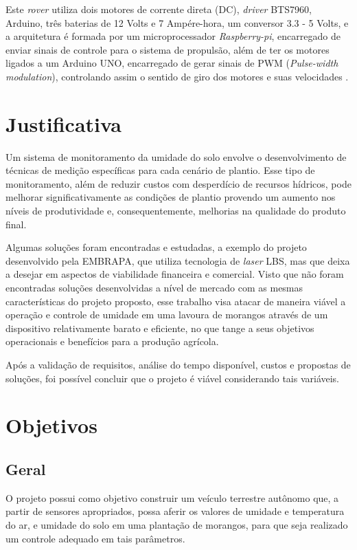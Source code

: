  Este \textit{rover} utiliza dois motores de corrente direta (DC), \textit{driver} BTS7960, Arduino, três
  baterias de 12 Volts e 7 Ampére-hora, um conversor 3.3 - 5 Volts, e a arquitetura
  é formada por um microprocessador \textit{Raspberry-pi}, encarregado de enviar sinais
  de controle para o sistema de propulsão, além de ter os motores ligados a um
  Arduino UNO, encarregado de gerar sinais de PWM (\textit{Pulse-width modulation}),
  controlando assim o sentido de giro dos motores e suas velocidades \cite{ARGOTE2014}.

  \section{Justificativa}

  Um sistema de monitoramento da umidade do solo envolve o desenvolvimento de
  técnicas de medição específicas para cada cenário de plantio. Esse tipo de
  monitoramento, além de reduzir custos com desperdício de recursos hídricos,
  pode melhorar significativamente as condições de plantio provendo um aumento
  nos níveis de produtividade e, consequentemente, melhorias na qualidade do
  produto final.

  Algumas soluções foram encontradas e estudadas, a exemplo do projeto
  desenvolvido pela EMBRAPA, que utiliza tecnologia de \textit{laser} LBS, mas que deixa
  a desejar em aspectos de viabilidade financeira e comercial. Visto que não
  foram encontradas soluções desenvolvidas a nível de mercado com as mesmas
  características do projeto proposto, esse trabalho visa atacar
  de maneira viável a operação e controle de umidade em uma lavoura de morangos
  através de um dispositivo relativamente barato e eficiente, no que tange a seus
  objetivos operacionais e benefícios para a produção agrícola.

  Após a validação de requisitos, análise do tempo disponível, custos e propostas
  de soluções, foi possível concluir que o projeto é viável considerando tais variáveis.

  \section{Objetivos}

  \subsection{Geral}

  O projeto possui como objetivo construir um veículo terrestre autônomo que,
  a partir de sensores apropriados, possa aferir os valores de umidade e temperatura do ar, e
  umidade do solo em uma plantação de morangos, para que seja realizado
  um controle adequado em tais parâmetros.


